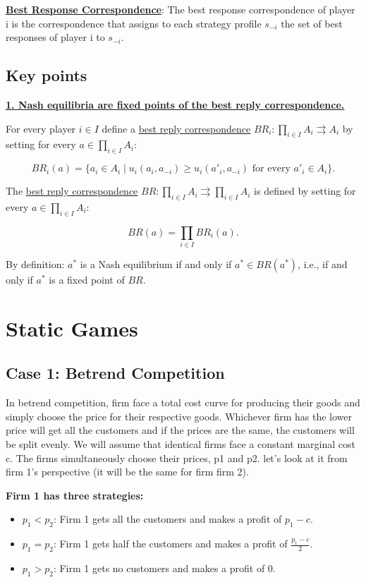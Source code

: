 \documentclass[12pt, oneside]{article}
\begin{document}
\underline{\textbf{Best Response Correspondence}}: The best response correspondence of player i is the correspondence that assigns to each strategy profile \( s_{-i} \) the set of best responses of player i to \( s_{-i} \).

\subsection{Key points}
\underline{\textbf{1. Nash equilibria are fixed points of the best reply correspondence.}}

For every player \( i \in I \) define a \underline{best reply correspondence} \( BR_i : \prod_{i \in I} A_i \rightrightarrows A_i \) by setting for every \( a \in \prod_{i \in I} A_i \):

\[
BR_i(a) = \{ a_i \in A_i \mid u_i(a_i, a_{-i}) \geq u_i(a'_i, a_{-i}) \text{ for every } a'_i \in A_i \}.
\]

The \underline{best reply correspondence} \( BR : \prod_{i \in I} A_i \rightrightarrows \prod_{i \in I} A_i \) is defined by setting for every \( a \in \prod_{i \in I} A_i \):

\[
BR(a) = \prod_{i \in I} BR_i(a).
\]

By definition: \( a^* \) is a Nash equilibrium if and only if \( a^* \in BR(a^*) \), i.e., if and only if \( a^* \) is a fixed point of \( BR \).



    \section{Static Games}

\subsection{Case 1: Betrend Competition}
In betrend competition, firm face a total cost curve for producing their goods and simply choose the price for their respective goods. 
Whichever firm has the lower price will get all the customers and if the prices are the same, the customers will be split evenly.
We will assume that identical firms face a constant marginal cost c. The firms simultaneously choose their prices, p1 and p2.
let's look at it from firm 1's perspective (it will be the same for firm firm 2). 

\textbf{Firm 1 has three strategies:}

\begin{itemize}
    \item $p_1 < p_2$: Firm 1 gets all the customers and makes a profit of $p_1 - c$.
    \item $p_1 = p_2$: Firm 1 gets half the customers and makes a profit of $\frac{p_1 - c}{2}$.
    \item $p_1 > p_2$: Firm 1 gets no customers and makes a profit of 0.
\end{itemize}
\end{document}
